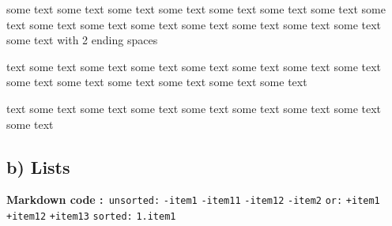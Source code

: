 \documentclass[11pt,a4paper]{report}
\begin{document}
{some text some text some text some text some text some text some text some text some text some text some text some text some text some text some text some text with 2 ending spaces\mbox{}\newline 

text some text some text some text some text some text some text some text some text some text some text some text some text some text

text some text some text some text some text some text some text some text some text\subsection*{b) Lists}{\bf Markdown code :}\texttt{\small
\mbox{}\newline \phantom{ }unsorted\phantom{ }:}\mbox{}\newline
\texttt{\small \phantom{ }}\mbox{}\newline
\texttt{\small \phantom{ }-\phantom{ }item1\phantom{ }}\mbox{}\newline
\texttt{\small \phantom{ }\phantom{ }\phantom{ }\phantom{ }\phantom{ }-\phantom{ }item11\phantom{ }}\mbox{}\newline
\texttt{\small \phantom{ }\phantom{ }\phantom{ }\phantom{ }\phantom{ }-\phantom{ }item12\phantom{ }}\mbox{}\newline
\texttt{\small \phantom{ }-\phantom{ }item2}\mbox{}\newline
\texttt{\small \phantom{ }}\mbox{}\newline
\texttt{\small \phantom{ }or\phantom{ }:}\mbox{}\newline
\texttt{\small \phantom{ }}\mbox{}\newline
\texttt{\small \phantom{ }+\phantom{ }item1\phantom{ }}\mbox{}\newline
\texttt{\small \phantom{ }\phantom{ }\phantom{ }\phantom{ }\phantom{ }+\phantom{ }item12}\mbox{}\newline
\texttt{\small \phantom{ }\phantom{ }\phantom{ }\phantom{ }\phantom{ }\phantom{ }\phantom{ }\phantom{ }\phantom{ }+\phantom{ }item13}\mbox{}\newline
\texttt{\small \phantom{ }\phantom{ }\phantom{ }\phantom{ }}\mbox{}\newline
\texttt{\small \phantom{ }sorted\phantom{ }:}\mbox{}\newline
\texttt{\small \phantom{ }}\mbox{}\newline
\texttt{\small \phantom{ }1.\phantom{ }item1\phantom{ }}\mbox{}\newline
}
\end{document}
